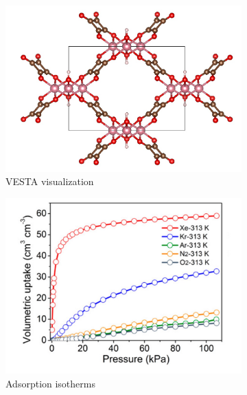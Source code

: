 \documentclass[main]{subfiles}
\begin{document}
\begin{figure}[ht]
  \centering
  \begin{subfigure}[b]{0.34\textwidth}
    \centering
    \includegraphics[width=\textwidth]{figures/6-perspectives/jacs_li.jpg}
    \caption{VESTA visualization\autocite{VESTA}}\label{fgr:jacs_li_str}
  \end{subfigure}
  \hfill
  \begin{subfigure}[b]{0.34\textwidth}
    \centering
    \includegraphics[width=\textwidth]{figures/6-perspectives/jacs_li_isotherm.jpg}
    \caption{Adsorption isotherms}\label{fgr:jacs_li_isotherm}
  \end{subfigure}
  \hfill
  \begin{subfigure}[b]{0.25\textwidth}
    \centering

\end{subfigure}
\end{figure}
\end{document}
